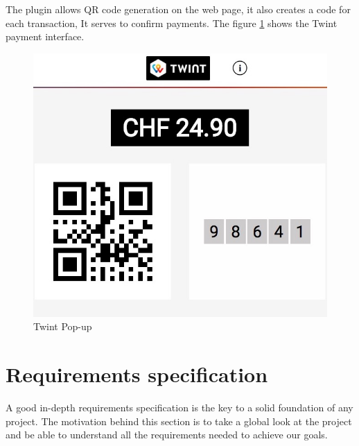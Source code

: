 \begin{spacing}{1.2}
\begin{itemize}
The plugin allows QR code generation on the web page, it also creates a code for each transaction, It serves to confirm payments.
The figure \ref{fig:twint} shows the Twint payment interface.
\begin{figure}[!ht]\centering
\includegraphics[scale=0.4]{twint.jpg}
\caption{Twint Pop-up}
\label{fig:twint}
\end{figure}
  \end{itemize}
  
  

\section{Requirements specification}
A good in-depth requirements specification is the key to a solid foundation of any project.
The motivation behind this section is to take a global look at the project and be able to understand all the requirements needed to achieve our goals.

\end{spacing}
